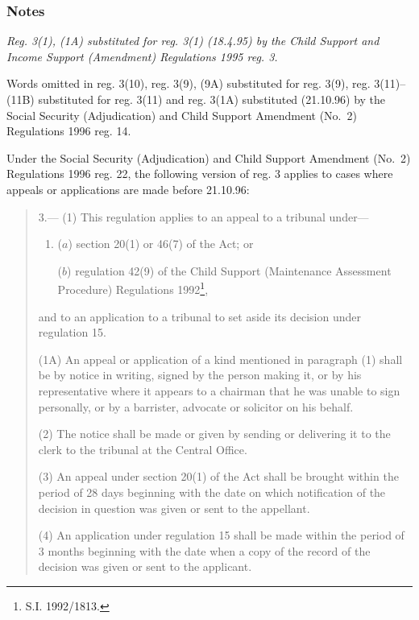 \documentclass[a4paper]{article}
\newcommand\amendment[1]{\subsubsection*{Notes}{\itshape\frenchspacing\footnotesize #1 \par}}
\begin{document}
\amendment{
Reg. 3(1), (1A) substituted for reg. 3(1) (18.4.95) by the Child Support and Income Support (Amendment) Regulations 1995 reg. 3.

Words omitted in reg. 3(10), reg. 3(9), (9A) substituted for reg. 3(9), reg. 3(11)--(11B) substituted for reg. 3(11) and reg. 3(1A) substituted (21.10.96) by the Social Security (Adjudication) and Child Support Amendment (No.\ 2) Regulations 1996 reg. 14.

Under the Social Security (Adjudication) and Child Support Amendment (No.\ 2) Regulations 1996 reg. 22, the following version of reg. 3 applies to cases where appeals or applications are made before 21.10.96:

\begin{quotation}
3.—%
(1) This regulation applies to an appeal to a tribunal under—
\begin{enumerate}\item[]
($a$) section 20(1) or 46(7) of the Act; or

($b$) regulation 42(9) of the Child Support (Maintenance Assessment Procedure) Regulations 1992\footnote{\frenchspacing S.I. 1992/1813.},
\end{enumerate}
and to an application to a tribunal to set aside its decision under regulation 15.

(1A) An appeal or application of a kind mentioned in paragraph (1) shall be by notice in writing, signed by the person making it, or by his representative where it appears to a chairman that he was unable to sign personally, or by a barrister, advocate or solicitor on his behalf.

(2) The notice shall be made or given by sending or delivering it to the clerk to the tribunal at the Central Office.

(3) An appeal under section 20(1) of the Act shall be brought within the period of 28 days beginning with the date on which notification of the decision in question was given or sent to the appellant.

(4) An application under regulation 15 shall be made within the period of 3 months beginning with the date when a copy of the record of the decision was given or sent to the applicant.


\end{quotation}}
\end{document}
